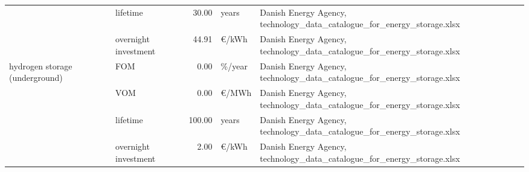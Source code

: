 \begin{longtable}{p{4cm}p{4cm}rp{3cm}p{10cm}}
                      & lifetime &        30.00 &                         years &                                                                                                                                                                                                                                                         Danish Energy Agency, technology\_data\_catalogue\_for\_energy\_storage.xlsx \\
                      & overnight investment &        44.91 &                     \euro/kWh &                                                                                                                                                                                                                                                         Danish Energy Agency, technology\_data\_catalogue\_for\_energy\_storage.xlsx \\
hydrogen storage (underground) & FOM &         0.00 &                       \%/year &                                                                                                                                                                                                                                                         Danish Energy Agency, technology\_data\_catalogue\_for\_energy\_storage.xlsx \\
                      & VOM &         0.00 &                     \euro/MWh &                                                                                                                                                                                                                                                         Danish Energy Agency, technology\_data\_catalogue\_for\_energy\_storage.xlsx \\
                      & lifetime &       100.00 &                         years &                                                                                                                                                                                                                                                         Danish Energy Agency, technology\_data\_catalogue\_for\_energy\_storage.xlsx \\
                      & overnight investment &         2.00 &                     \euro/kWh &                                                                                                                                                                                                                                                         Danish Energy Agency, technology\_data\_catalogue\_for\_energy\_storage.xlsx \\

\end{longtable}
